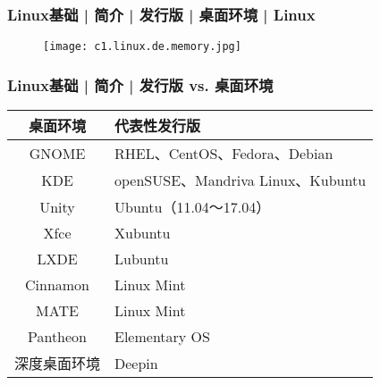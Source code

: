 \begin{frame}
  \frametitle{Linux基础 | 简介 | 发行版 | 桌面环境 | Linux}
  \begin{figure}
    \centering
    \texttt{[image: c1.linux.de.memory.jpg]}
  \end{figure}
\end{frame}

\begin{frame}
  \frametitle{Linux基础 | 简介 | \alert{发行版 vs. 桌面环境}}
  \begin{table}
    \centering
    \begin{tabular}{cl}
      \hline
      \rowcolor{blue!50}桌面环境 & 代表性发行版\\
      \hline
      GNOME & RHEL、CentOS、Fedora、Debian\\
      KDE & openSUSE、Mandriva Linux、Kubuntu\\
      Unity & Ubuntu（11.04～17.04）\\
      Xfce & Xubuntu\\
      LXDE & Lubuntu\\
      Cinnamon & Linux Mint\\
      MATE & Linux Mint\\
      Pantheon & Elementary OS\\
      深度桌面环境 & Deepin\\
      \hline
    \end{tabular}
  \end{table}
\end{frame}

